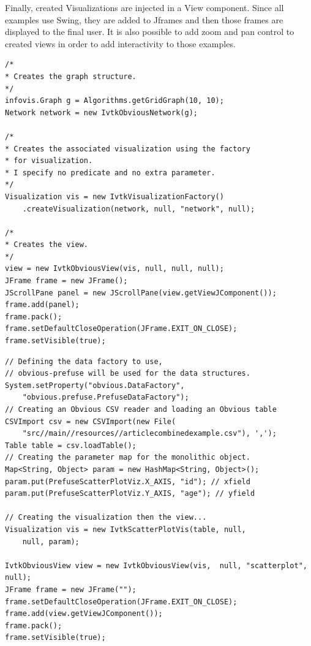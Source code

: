 Finally,  created Visualizations are injected in a View component. Since all examples use Swing, they are added to Jframes and then those frames are displayed to the final user. It is also possible to add zoom and pan control to created views in order to add interactivity to those examples.

\begin{lstlisting}
/*
* Creates the graph structure.
*/
infovis.Graph g = Algorithms.getGridGraph(10, 10);
Network network = new IvtkObviousNetwork(g);

/*
* Creates the associated visualization using the factory
* for visualization.
* I specify no predicate and no extra parameter.
*/
Visualization vis = new IvtkVisualizationFactory()
    .createVisualization(network, null, "network", null);

/*
* Creates the view.
*/
view = new IvtkObviousView(vis, null, null, null);
JFrame frame = new JFrame();
JScrollPane panel = new JScrollPane(view.getViewJComponent());
frame.add(panel);
frame.pack();
frame.setDefaultCloseOperation(JFrame.EXIT_ON_CLOSE);
frame.setVisible(true);
\end{lstlisting}

\begin{lstlisting}
// Defining the data factory to use,
// obvious-prefuse will be used for the data structures.
System.setProperty("obvious.DataFactory",
    "obvious.prefuse.PrefuseDataFactory");
// Creating an Obvious CSV reader and loading an Obvious table
CSVImport csv = new CSVImport(new File(
    "src//main//resources//articlecombinedexample.csv"), ',');
Table table = csv.loadTable();
// Creating the parameter map for the monolithic object.
Map<String, Object> param = new HashMap<String, Object>();
param.put(PrefuseScatterPlotViz.X_AXIS, "id"); // xfield
param.put(PrefuseScatterPlotViz.Y_AXIS, "age"); // yfield

// Creating the visualization then the view...
Visualization vis = new IvtkScatterPlotVis(table, null,
    null, param);

IvtkObviousView view = new IvtkObviousView(vis,  null, "scatterplot", null);
JFrame frame = new JFrame("");
frame.setDefaultCloseOperation(JFrame.EXIT_ON_CLOSE);
frame.add(view.getViewJComponent());
frame.pack();
frame.setVisible(true);
\end{lstlisting}
